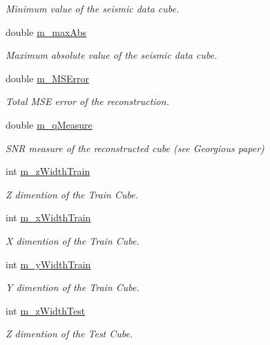 \begin{DoxyCompactItemize}
\begin{DoxyCompactList}\small\item\em Minimum value of the seismic data cube. \end{DoxyCompactList}\item 
double \hyperlink{classDataReader_a9a9066f2dafe278b3acd45e84cc2126e}{m\+\_\+max\+Abs}
\begin{DoxyCompactList}\small\item\em Maximum absolute value of the seismic data cube. \end{DoxyCompactList}\item 
double \hyperlink{classDataReader_aeb1b06be9af5ea726e9b8ad11b5b34f1}{m\+\_\+\+M\+S\+Error}
\begin{DoxyCompactList}\small\item\em Total M\+SE error of the reconstruction. \end{DoxyCompactList}\item 
double \hyperlink{classDataReader_a5bba6f4ec228522330fda878214f7395}{m\+\_\+q\+Measure}
\begin{DoxyCompactList}\small\item\em S\+NR measure of the reconstructed cube (see Georgious paper) \end{DoxyCompactList}\item 
int \hyperlink{classDataReader_ae74053a5592498d373fc12254145ce39}{m\+\_\+z\+Width\+Train}
\begin{DoxyCompactList}\small\item\em Z dimention of the Train Cube. \end{DoxyCompactList}\item 
int \hyperlink{classDataReader_a0c4b86a80694b557fe1509b615b76244}{m\+\_\+x\+Width\+Train}
\begin{DoxyCompactList}\small\item\em X dimention of the Train Cube. \end{DoxyCompactList}\item 
int \hyperlink{classDataReader_a4a627c7884969007b149ce1023ee3e11}{m\+\_\+y\+Width\+Train}
\begin{DoxyCompactList}\small\item\em Y dimention of the Train Cube. \end{DoxyCompactList}\item 
int \hyperlink{classDataReader_a2c029cc64a4c674ee19477c9bfcc2ae6}{m\+\_\+z\+Width\+Test}
\begin{DoxyCompactList}\small\item\em Z dimention of the Test Cube. \end{DoxyCompactList}\item 

\end{DoxyCompactItemize}

